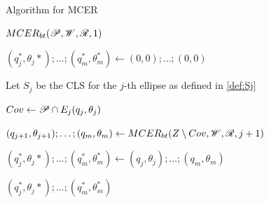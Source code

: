 \begin{algorithm}
	\caption{Algorithm for MCER}\label{algoritmo:mcer}
	\begin{algorithmic}[1]
		
		
		\item[]
		\State \Return $MCER_{bt}(\mathscr{P}, \mathscr{W}, \mathscr{R}, 1)$
		\EndProcedure
		
		\item[]
		
		
		\State $(q_{j}^*,\theta_j*); \dots; (q_m^*, \theta_m^*) \gets (0,0); \dots; (0, 0)$ 
		
		\State Let $S_j$ be the CLS for the $j$-th ellipse as defined in \autoref{def:Sj}
		
		\State $Cov \gets \mathscr{P} \cap E_j(q_j, \theta_j)$
		
		\State $(q_{j+1},\theta_{j+1}); \dots; (q_m,\theta_m) \gets  MCER_{bt}(Z\setminus Cov, \mathscr{W}, \mathscr{R}, j+1)$
		\EndIf
		
		
		\State $(q_{j}^*,\theta_j*); \dots; (q_m^*, \theta_m^*) \gets  (q_{j},\theta_{j}); \dots; (q_m,\theta_m) $
		\EndIf
		\EndFor
		
		\State \Return $(q_{j}^*,\theta_j*); \dots; (q_m^*, \theta_m^*)$
		\EndProcedure
	\end{algorithmic}
\end{algorithm}